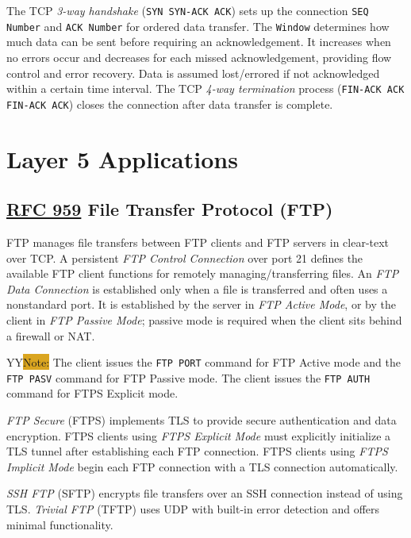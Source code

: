 \documentclass[12pt]{article}
\newcommand{\printColor}{Y}								%
\newcommand{\note}[1]{\if\printColor Y{\colorbox{#1}{Note:}}\else{\underline{Note:}}\fi}
\newcommand{\RFC}[1]{\href{https://datatracker.ietf.org/doc/html/rfc#1}{RFC #1}}
\begin{document}
	The TCP \textit{3-way handshake} (\texttt{SYN SYN-ACK ACK}) sets up the connection \texttt{SEQ Number} and \texttt{ACK Number} for ordered data transfer. The \texttt{Window} determines how much data can be sent before requiring an acknowledgement. It increases when no errors occur and decreases for each missed acknowledgement, providing flow control and error recovery. Data is assumed lost/errored if not acknowledged within a certain time interval. The TCP \textit{4-way termination} process (\texttt{FIN-ACK ACK FIN-ACK ACK}) closes the connection after data transfer is complete.





\section{Layer 5 Applications \label{sec:L5}}

	\subsection[RFC 959 FTP]{\RFC{959} File Transfer Protocol (FTP) \label{subsec:FTP}}
	FTP manages file transfers between FTP clients and FTP servers in clear-text over TCP. A persistent \textit{FTP Control Connection} over port 21 defines the available FTP client functions for remotely managing/transferring files. An \textit{FTP Data Connection} is established only when a file is transferred and often uses a nonstandard port. It is established by the server in \textit{FTP Active Mode}, or by the client in \textit{FTP Passive Mode}; passive mode is required when the client sits behind a firewall or NAT.

	\note{Goldenrod} The client issues the \texttt{FTP PORT} command for FTP Active mode and the \texttt{FTP PASV} command for FTP Passive mode. The client issues the \texttt{FTP AUTH} command for FTPS Explicit mode.

	\textit{FTP Secure} (FTPS) implements TLS to provide secure authentication and data encryption. FTPS clients using \textit{FTPS Explicit Mode} must explicitly initialize a TLS tunnel after establishing each FTP connection. FTPS clients using \textit{FTPS Implicit Mode} begin each FTP connection with a TLS connection automatically.

	\textit{SSH FTP} (SFTP) encrypts file transfers over an SSH connection instead of using TLS. \textit{Trivial FTP} (TFTP) uses UDP with built-in error detection and offers minimal functionality.
\end{document}
